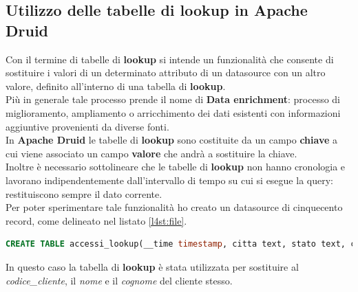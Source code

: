 \subsection{Utilizzo delle tabelle di lookup in Apache Druid}
Con il termine di tabelle di \textbf{lookup} si intende un funzionalità che consente di sostituire i valori 
di un determinato attributo di un \gls{datasource}{} con un altro valore, definito all'interno di una tabella di \textbf{lookup}.\\
Più in generale tale processo prende il nome di \textbf{Data enrichment}: processo di miglioramento, ampliamento o arricchimento dei dati esistenti con informazioni 
aggiuntive provenienti da diverse fonti. \\
In \textbf{Apache Druid} le tabelle di \textbf{lookup} sono costituite da un campo \textbf{chiave} a cui viene associato un campo \textbf{valore} che andrà a sostituire la chiave.\\
Inoltre è necessario sottolineare che le tabelle di \textbf{lookup} non hanno cronologia e lavorano indipendentemente dall'intervallo di tempo su cui si esegue la query: restituiscono sempre il dato corrente.\\
Per poter sperimentare tale funzionalità ho creato un \gls{datasource}{} di cinquecento record, come delineato nel listato \ref{l4st:file}.
\begin{lstlisting}[language=SQL,label=l4st:file]
  CREATE TABLE accessi_lookup(__time timestamp, citta text, stato text, codice_cliente text);
\end{lstlisting}
In questo caso la tabella di \textbf{lookup} è stata utilizzata per  sostituire al \textit{codice\_cliente}, il \textit{nome} e il \textit{cognome} del cliente stesso.
